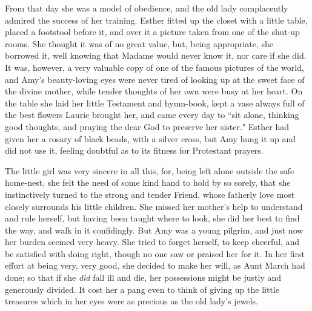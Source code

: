 From that day she was a model of obedience, and the old lady
complacently admired the success of her training. Esther fitted up the
closet with a little table, placed a footstool before it, and over it a
picture taken from one of the shut-up rooms. She thought it was of no
great value, but, being appropriate, she borrowed it, well knowing that
Madame would never know it, nor care if she did. It was, however, a very
valuable copy of one of the famous pictures of the world, and
Amy's beauty-loving eyes were never tired of looking up
at the sweet face of the divine mother, while tender thoughts of her own
were busy at her heart. On the table she laid her little Testament and
hymn-book, kept a vase always full of the best flowers Laurie brought
her, and came every day to ``sit alone, thinking good thoughts, and
praying the dear God to preserve her sister." Esther had given her a
rosary of black beads, with a silver cross, but Amy hung it up and did
not use it, feeling doubtful as to its fitness for Protestant prayers.

The little girl was very sincere in all this, for, being left alone
outside the safe home-nest, she felt the need of some kind hand to hold
by so sorely, that she instinctively turned to the strong and tender
Friend, whose fatherly love most closely surrounds his little children.
She missed her mother's help to understand and rule
herself, but having been taught where to look, she did her best to find
the way, and walk in it confidingly. But Amy was a young pilgrim, and
just now her burden seemed very heavy. She tried to forget herself, to
keep cheerful, and be satisfied with doing right, though no one saw or
praised her for it. In her first effort at being very, very good, she
decided to make her will, as Aunt March had done; so that if she
\emph{did} fall ill and die, her possessions might be justly and
generously divided. It cost her a pang even to think of giving up the
little treasures which in her eyes were as precious as the old
lady's jewels.

